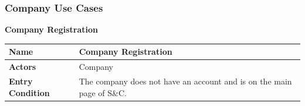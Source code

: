     \newpage
    \subsubsection{Company Use Cases}
    
        \begin{enumerate}[label=\textbf{[US\arabic*]}, left = 0pt, align = left, resume]
            \item \textbf{Company Registration}
        
            \begin{longtable}{|l|p{11cm}|}  
                \hline
                \textbf{Name} & 
                    \textbf{Company Registration} \\
                \hline
                
                \textbf{Actors} & 
                    Company \\
                \hline
                
                \textbf{Entry Condition} & 
                    The company does not have an account and is on the main page of S\&C. \\
                \hline
                

\end{longtable}
\end{enumerate}
